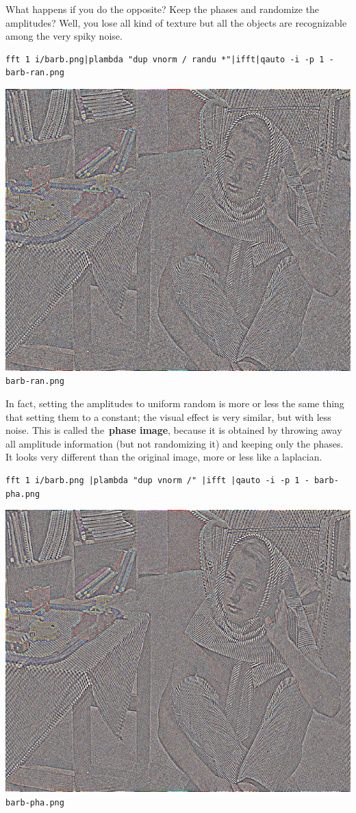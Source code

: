 What happens if you do the opposite?  Keep the phases and randomize the
amplitudes?  Well, you lose all kind of texture but all the objects are
recognizable among the very spiky noise.

\begin{verbatim}
fft 1 i/barb.png|plambda "dup vnorm / randu *"|ifft|qauto -i -p 1 - barb-ran.png
\end{verbatim}
\includegraphics{barb-ran.png}{\small\tt barb-ran.png}


In fact, setting the amplitudes to uniform random is more or less the same
thing that setting them to a constant; the visual effect is very similar, but
with less noise.  This is called the~{\bf phase image}, because it is
obtained by throwing away all amplitude information (but not randomizing it)
and keeping only the phases.  It looks very different than the original
image, more or less like a laplacian.

\begin{verbatim}
fft 1 i/barb.png |plambda "dup vnorm /" |ifft |qauto -i -p 1 - barb-pha.png
\end{verbatim}
\includegraphics{barb-pha.png}{\small\tt barb-pha.png}


